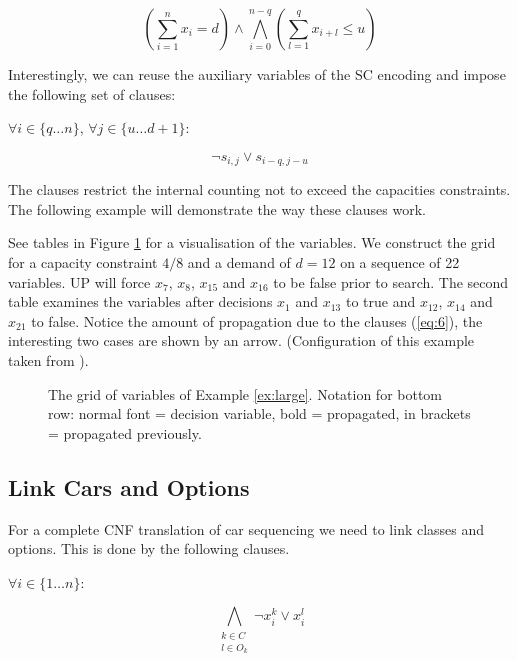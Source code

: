 \documentclass[]{llncs}
\begin{document}
$$ (\sum_{i=1}^n x_{i} = d) \wedge \bigwedge_{i=0}^{n-q}(\sum_{l=1}^q x_{i+l} \leq u )$$

Interestingly, we can reuse the auxiliary variables of the SC encoding and impose the following set of clauses: 

$\forall {i \in \{q \ldots n\}}$, $\forall {j\in\{u\ldots d+1\}}$: 

\begin{equation} \label{eq:6}
    \neg s_{i,j} \vee s_{i-q,j-u}
\end{equation}               

The clauses restrict the internal counting not to exceed the capacities constraints. The following example will demonstrate
the way these clauses work. 

\begin{example}
\label{ex:large} See tables in Figure \ref{fig3} for a visualisation of the variables. We construct the grid for a
capacity constraint $4/8$ and a demand of $d=12$ on a sequence of 22 variables. UP will force $x_{7}$, $x_{8}$, $x_{15}$
and $x_{16}$ to be false prior to search. The second table examines the variables after decisions $x_{1}$ and $x_{13}$ to
true and $x_{12}$, $x_{14}$ and $x_{21}$ to false. Notice the amount of propagation due to the clauses (\ref{eq:6}), the
interesting two cases are shown by an arrow. (Configuration of this example taken from  \cite{Siala12}). 
\end{example}

\begin{figure}
\centering 
\caption{The grid of variables of Example \ref{ex:large}. Notation for bottom row: normal font = decision variable, bold
= propagated, in brackets = propagated previously.}


\label{fig3}
\end{figure}

\subsection{Link Cars and Options}

For a complete CNF translation of car sequencing we need to link classes and options. This is done by the following
clauses. 

$\forall i\in \{1\ldots n\}$: 

\begin{equation} \label{eq:7}
     \bigwedge_{\substack{k \in C \\ l \in O_k }} \neg x^k_{i} \vee x^l_{i}
\end{equation}
\end{document}
